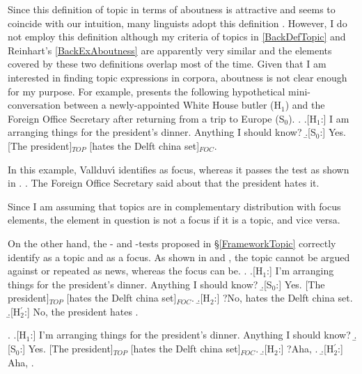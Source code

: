 Since this definition of topic in terms of aboutness is attractive and seems to coincide with our intuition,
many linguists adopt this definition \cite[e.g.,][]{lambrecht94,erteschik-shir07}.
However, I do not employ this definition
although my criteria of topics in \ref{BackDefTopic} and Reinhart's \ref{BackExAboutness} are apparently very similar and
the elements covered by these two definitions overlap most of the time.
Given that I am interested in finding topic expressions in corpora,
aboutness is not clear enough for my purpose.
For example,  presents the following hypothetical mini-conversation between a newly-appointed White House butler (H$_{1}$) and the Foreign Office Secretary after returning from a trip to Europe (S$_{0}$).
%
\ex. \a.[H$_{1}$:] I am arranging things for the president's dinner. Anything I should know?
     \b.[S$_{0}$:] Yes. [The president]$_{TOP}$ [hates the Delft china set]$_{FOC}$.\\
     \begin{flushright}
     {\cite[9, 12]{vallduvi94}}
     \end{flushright}

In this example, Vallduv\'{\i} identifies  as focus,
whereas it passes the  test as shown in \Next.
%
\ex. The Foreign Office Secretary said about  that the president hates it.

Since I am assuming that topics are in complementary distribution with focus elements,
the element in question is not a focus if it is a topic, and vice versa.

On the other hand, the - and -tests proposed in \S \ref{FrameworkTopic} correctly identify  as a topic and  as a focus.
As shown in \Next[H$_{2}$] and \NNext[H$_{2}$],
the topic  cannot be argued against or repeated as news,
whereas the focus  can be.
%
\ex. \a.[H$_{1}$:] I'm arranging things for the president's dinner. Anything I should know?
     \b.[S$_{0}$:] Yes. [The president]$_{TOP}$ [hates the Delft china set]$_{FOC}$.
     \b.[H$_{2}$:] ?No,  hates the Delft china set.
     \b.[H$_{2}^{\prime}$:] No, the president hates .

\ex. \a.[H$_{1}$:] I'm arranging things for the president's dinner. Anything I should know?
     \b.[S$_{0}$:] Yes. [The president]$_{TOP}$ [hates the Delft china set]$_{FOC}$.
     \b.[H$_{2}$:] ?Aha, .
     \b.[H$_{2}^{\prime}$:] Aha, .


